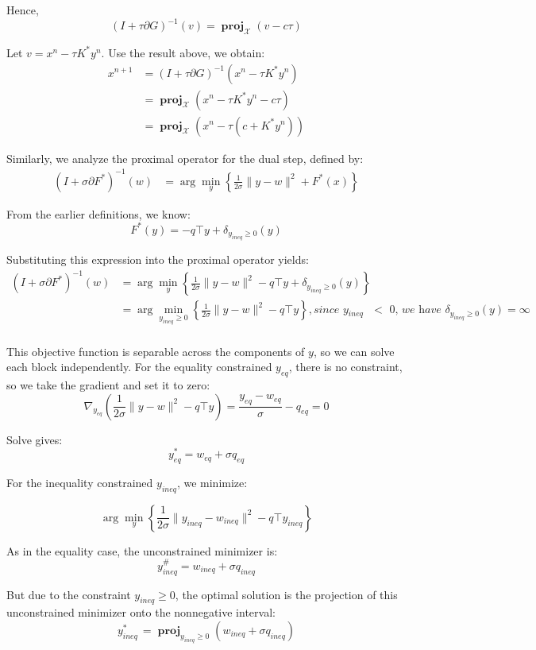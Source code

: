 \documentclass[twoside,12pt,openright]{report}  %
\DeclareMathOperator*{\proj}{\textbf{proj}}
\begin{document}
Hence, 
\[
(I + \tau \partial G)^{-1}(v) = \proj_{\mathcal{X}}(v-c\tau)
\]

Let \(v = x^n-\tau K^*y^n\). Use the result above, we obtain:
\[
\begin{aligned}
    x^{n+1} &= (I + \tau \partial G)^{-1}(x^n-\tau K^*y^n)\\
    &= \proj_{\mathcal{X}}(x^n-\tau K^*y^n-c\tau) \\
    &= \proj_{\mathcal{X}}(x^n-\tau(c+ K^*y^n))
\end{aligned}
\]

Similarly, we analyze the proximal operator for the dual step, defined by:
\[
\begin{aligned}
    (I + \sigma \partial F^*)^{-1}(w) &=  \arg\min_{y}\left\{ \frac{1}{2\sigma}\|y - w\|^2 + F^*(x) \right\}
\end{aligned}
\]

From the earlier definitions, we know:
\[
F^*(y) = -q\top y + \delta_{y_{ineq}\ge0}(y)
\]

Substituting this expression into the proximal operator yields:
\[
\begin{aligned}
    (I + \sigma \partial F^*)^{-1}(w) &=  \arg\min_{y}\left\{ \frac{1}{2\sigma}\|y - w\|^2 -q\top y + \delta_{y_{ineq}\ge0}(y) \right\} \\
    &= \arg\min_{y_{ineq}\ge0}\left\{ \frac{1}{2\sigma}\|y - w\|^2 -q\top y \right\}, \textit{since  y$_{ineq}$ $<$ 0, we have }\delta_{y_{ineq}\ge0}(y) = \infty\\ 
\end{aligned}
\]

This objective function is separable across the components of \(y\), so we can solve each block independently. For the equality constrained \(y_{eq}\), there is no constraint, so we take the gradient and set it to zero:
\[
\nabla_{y_{eq}} (\frac{1}{2\sigma}\|y - w\|^2 -q\top y ) = \frac{y_{eq}-w_{eq}}{\sigma} -q_{eq} = 0
\]

Solve gives:
\[
y_{eq}^* = w_{eq} + \sigma q_{eq}
\]

For the inequality constrained \(y_{ineq}\), we minimize:

\[
\arg\min_{y}\left\{ \frac{1}{2\sigma}\|y_{ineq} - w_{ineq}\|^2 - q\top y_{ineq} \right\}
\]

As in the equality case, the unconstrained minimizer is:
\[
y_{ineq} ^{\#} = w_{ineq} + \sigma q_{ineq}
\]

But due to the constraint \(y_{ineq} \ge 0\), the optimal solution is the projection of this unconstrained minimizer onto the nonnegative interval:
\[
{y_{ineq \ }^*} = \proj_{y_{ineq} \ge 0} (w_{ineq} + \sigma q_{ineq})
\]
\end{document}
